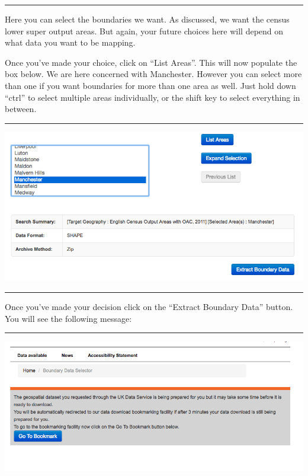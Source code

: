 \documentclass[
]{book}
\begin{document}
\begin{center}\rule{0.5\linewidth}{0.5pt}\end{center}

Here you can select the boundaries we want. As discussed, we want the census lower super output areas. But again, your future choices here will depend on what data you want to be mapping.

Once you've made your choice, click on ``List Areas''. This will now populate the box below. We are here concerned with Manchester. However you can select more than one if you want boundaries for more than one area as well. Just hold down ``ctrl'' to select multiple areas individually, or the shift key to select everything in between.

\begin{center}\rule{0.5\linewidth}{0.5pt}\end{center}

\includegraphics{img/boundary_selector_3.png}

\begin{center}\rule{0.5\linewidth}{0.5pt}\end{center}

Once you've made your decision click on the ``Extract Boundary Data'' button. You will see the following message:

\begin{center}\rule{0.5\linewidth}{0.5pt}\end{center}

\includegraphics{img/wait.png}
\end{document}
